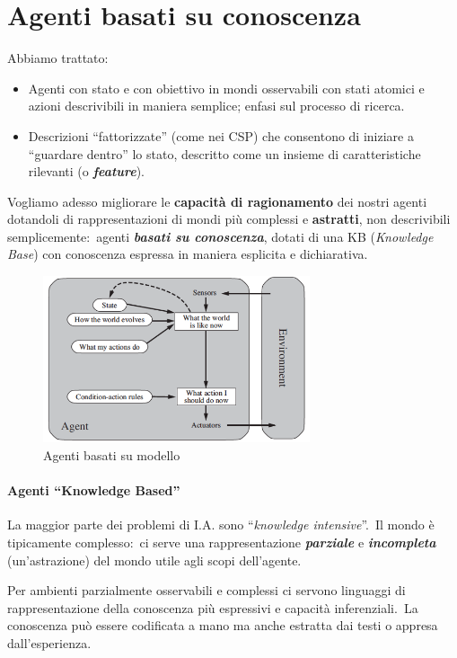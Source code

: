 \chapter{Agenti basati su conoscenza}

Abbiamo trattato:
\begin{itemize}
	\item Agenti con stato e con obiettivo in mondi osservabili con stati atomici e azioni descrivibili in maniera semplice; enfasi sul processo di ricerca.
	\item Descrizioni ``fattorizzate'' (come nei CSP) che consentono di iniziare a ``guardare dentro'' lo stato,
	      descritto come un insieme di caratteristiche rilevanti (o \textbf{\textit{feature}}).
\end{itemize}
Vogliamo adesso migliorare le \textbf{capacità di ragionamento} dei nostri agenti dotandoli di rappresentazioni di mondi più complessi e \textbf{astratti}, non descrivibili semplicemente:\ agenti \textbf{\textit{basati su conoscenza}}, dotati di una KB (\textit{Knowledge Base}) con conoscenza espressa in maniera esplicita e dichiarativa.

\begin{figure}[H]
	\centering
	\includegraphics[width=0.7\textwidth]{immagini/AgentiConoscenti.png}
	\caption*{Agenti basati su modello}
\end{figure}

\subsubsection{Agenti ``Knowledge Based''}

La maggior parte dei problemi di I.A. sono ``\textit{knowledge intensive}''.\
Il mondo è tipicamente complesso:\ ci serve una rappresentazione \textbf{\textit{parziale}} e \textbf{\textit{incompleta}} (un'astrazione) del mondo utile agli scopi dell'agente.\

Per ambienti parzialmente osservabili e complessi ci servono linguaggi di rappresentazione della conoscenza più espressivi e capacità inferenziali.\
La conoscenza può essere codificata a mano ma anche estratta dai testi o appresa dall'esperienza.

